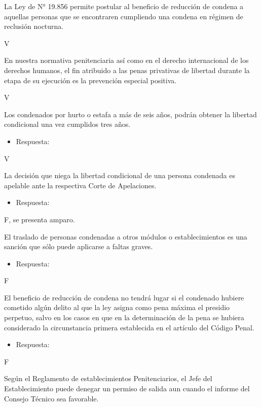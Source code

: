 \documentclass[letterpaper, 11pt]{article}
\begin{document}
La Ley de N° 19.856 permite postular al beneficio de reducción de condena a
aquellas personas que se encontraren cumpliendo una condena en régimen de
reclusión nocturna.

V

En nuestra normativa penitenciaria así como en el derecho internacional de los
derechos humanos, el fin atribuido a las penas privativas de libertad durante la
etapa de su ejecución es la prevención especial positiva.

V


Los condenados por hurto o estafa a más de seis años, podrán obtener
la libertad condicional una vez cumplidos tres años.


\begin{itemize}
\item Respuesta:
\end{itemize}

V

La decisión que niega la libertad condicional de una persona condenada
es apelable ante la respectiva Corte de Apelaciones.


\begin{itemize}
\item Respuesta:
\end{itemize}

F, se presenta amparo.



El traslado de personas condenadas a otros módulos o establecimientos
es una sanción que sólo puede aplicarse a faltas graves.


\begin{itemize}
\item Respuesta:
\end{itemize}

F


El beneficio de reducción de condena no tendrá lugar si el condenado
hubiere cometido algún delito al que la ley asigna como pena máxima el
presidio perpetuo, salvo en los casos en que en la determinación de la
pena se hubiera considerado la circunstancia primera establecida en el
artículo del Código Penal.


\begin{itemize}
\item Respuesta:
\end{itemize}

F


Según el Reglamento de establecimientos Penitenciarios, el Jefe del
Establecimiento puede denegar un permiso de salida aun cuando el
informe del Consejo Técnico sea favorable.
\end{document}
